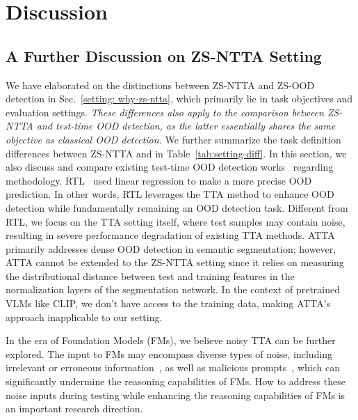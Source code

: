 \section{Discussion}
\subsection{A Further Discussion on ZS-NTTA Setting}\label{app:discuss-setting}
We have elaborated on the distinctions between ZS-NTTA and ZS-OOD detection in Sec.~\ref{setting: why-zs-ntta}, which primarily lie in task objectives and evaluation settings. \textit{These differences also apply to the comparison between ZS-NTTA and test-time OOD detection, as the latter essentially shares the same objective as classical OOD detection.}
We further summarize the task definition differences between ZS-NTTA and \cite{fan2024test, gao2023atta} in Table~\ref{tab:setting-diff}.
In this section, we also discuss and compare existing test-time OOD detection works~\citep{fan2024test, gao2023atta} regarding methodology. RTL~\citep{fan2024test} used linear regression to make a more precise OOD prediction. In other words, RTL leverages the TTA method to enhance OOD detection while fundamentally remaining an OOD detection task. Different from RTL, we focus on the TTA setting itself, where test samples may contain noise, resulting in severe performance degradation of existing TTA methods.
ATTA~\citep{gao2023atta} primarily addresses dense OOD detection in semantic segmentation; however, ATTA cannot be extended to the ZS-NTTA setting since it relies on measuring the distributional distance between test and training features in the normalization layers of the segmentation network. In the context of pretrained VLMs like CLIP, we don't have access to the training data, making ATTA's approach inapplicable to our setting.

In the era of Foundation Models (FMs), we believe noisy TTA can be further explored. The input to FMs may encompass diverse types of noise, including irrelevant or erroneous information~\citep{zhou2024can, shi2023large}, as well as malicious prompts~\citep{wei2024jailbroken, li2023deepinception}, which can significantly undermine the reasoning capabilities of FMs. How to address these noise inputs during testing while enhancing the reasoning capabilities of FMs is an important research direction.

